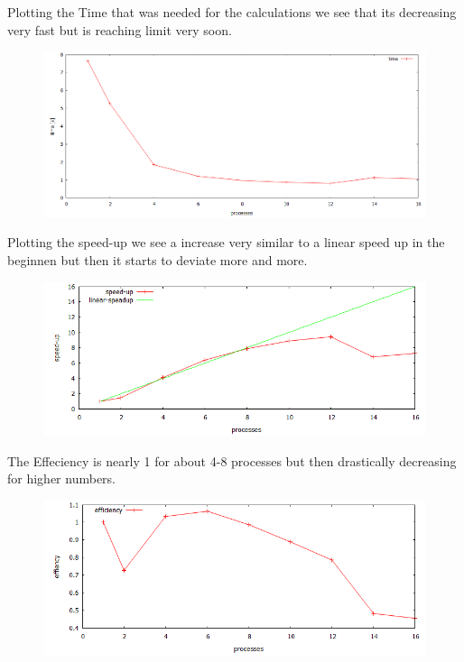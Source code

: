 \documentclass[a4paper,11pt]{scrartcl}
\begin{document}
Plotting the Time that was needed for the calculations we see that its decreasing very fast but is reaching limit very soon.

\begin{figure}[!h]
\includegraphics[width=\linewidth,
keepaspectratio]{2_3a}
\centering

\end{figure}

Plotting the speed-up we see a increase very similar to a linear speed up in the beginnen but then it starts to deviate more and more.
\begin{figure}[htbp]
\includegraphics[width=\linewidth,
keepaspectratio]{2_3b}
\centering

\end{figure}

The Effeciency is nearly 1 for about 4-8 processes but then drastically decreasing for higher numbers.

\begin{figure}[htbp]
\includegraphics[width=\linewidth,
keepaspectratio]{2_3c}
\centering

\end{figure}
\end{document}
